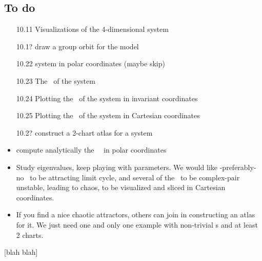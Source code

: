 \subsection{To do}
\label{s:ToDo}

\begin{itemize}
  \item[10.11] Visualizations of the 4-dimensional {\twomode} system
  \item[10.1?] draw a group orbit for the {\twomode} model
  \item[10.22] {\twoMode} system in polar coordinates (maybe skip)
  \item[10.23] The \reqva\ of the {\twomode} system
  \item[10.24] Plotting the \reqva\ of
           the {\twomode} system in invariant coordinates
  \item[10.25] Plotting the \reqva\ of
           the {\twomode} system in Cartesian coordinates
  \item[10.2?] construct a 2-chart atlas
            for a {\twomode} system
  \item
        compute analytically the \stabmat\ \Mvar\ in polar coordinates
  \item
        Study eigenvalues, keep playing with parameters. We would like
        -preferably- no \reqv\ to be attracting limit cycle, and several of
        the \reqva\ to be complex-pair unstable, leading to chaos, to be
        visualized and sliced in Cartesian coordinates.
  \item
        If you find a nice chaotic attractors, others can join in
        constructing an atlas for it. We just need one and only one
        example with non-trivial \chartBord s and at least 2 charts.
\end{itemize}

 [blah blah]

